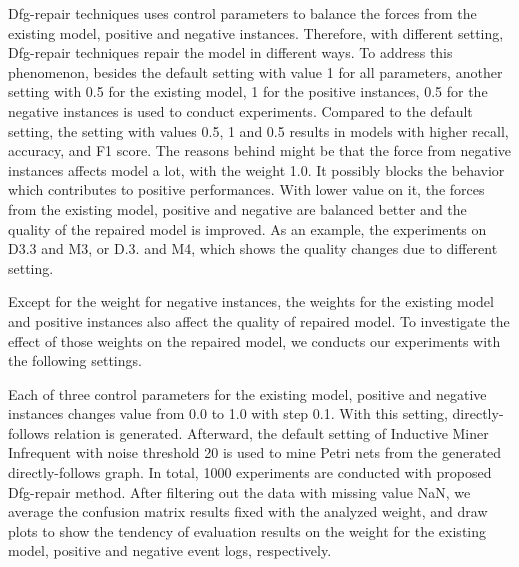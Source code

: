 Dfg-repair techniques uses control parameters to balance the forces from the existing model, positive and negative instances. Therefore, with different setting, Dfg-repair techniques repair the model in different ways. To address this phenomenon, besides the default setting with value 1 for all parameters, another setting with 0.5 for the existing model, 1 for the positive instances, 0.5 for the negative instances is used to conduct experiments.  Compared to the default setting, the setting with values 0.5, 1 and 0.5 results in models with higher recall, accuracy, and F1 score. The reasons behind might be that the force from negative instances affects model a lot, with the weight 1.0. It possibly blocks the behavior which contributes to positive performances.  With lower value on it, the forces from the existing model, positive and negative are balanced better and the quality of the repaired model is improved. As an example, the experiments on D3.3 and M3, or D.3. and M4, which shows the quality changes due to different setting.

Except for the weight for negative instances, the weights for the existing model and positive instances also affect the quality of repaired model. To investigate the effect of those weights on the repaired model, we conducts our experiments with the following settings.


Each of three control parameters for the existing model, positive and negative instances changes value from 0.0 to 1.0 with step 0.1. With this setting, directly-follows relation is generated. Afterward, the default setting of Inductive Miner Infrequent with noise threshold 20 is used to mine Petri nets from the generated directly-follows graph. In total, 1000 experiments are conducted with proposed Dfg-repair method. 
After filtering out the data with missing value NaN, we average the confusion matrix results fixed with the analyzed weight,  and draw plots to show the tendency of evaluation results on the weight for the existing model, positive and negative event logs, respectively. 

